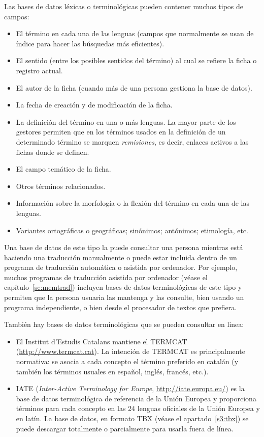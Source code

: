 Las bases de datos léxicas o terminológicas pueden contener muchos tipos de campos: \begin{itemize} \item El término en cada una de las lenguas (campos que normalmente se usan de índice para hacer las búsquedas más eficientes). \item El sentido (entre los posibles sentidos del término) al cual se refiere la ficha o registro actual. \item El autor de la ficha (cuando más de una persona gestiona la base de datos). \item La fecha de creación y de modificación de la ficha. \item La definición del término en una o más lenguas. La mayor parte de los gestores permiten que en los términos usados en la definición de un determinado término se marquen \emph{remisiones}, es decir, enlaces activos a las fichas donde se definen. \item El campo temático de la ficha. \item Otros términos relacionados. \item Información sobre la morfología o la flexión del término en cada una de las lenguas. \item Variantes ortográficas o geográficas; sinónimos; antónimos; etimología, etc. \end{itemize} 

Una base de datos de este tipo la puede consultar una persona mientras está haciendo una traducción manualmente o puede estar incluida dentro de un programa de traducción automática o asistida por ordenador. Por ejemplo, muchos programas de traducción asistida por ordenador (véase el capítulo~\ref{se:memtrad}) incluyen bases de datos terminológicas de este tipo y permiten que la persona usuaria las mantenga y las consulte, bien usando un programa independiente, o bien desde el procesador de textos que prefiera. 

También hay bases de datos terminológicas que se pueden consultar en linea: \begin{itemize} \item El Institut d'Estudis Catalans mantiene el TERMCAT (\url{http://www.termcat.cat}). La intención de TERMCAT es principalmente normativa: se asocia a cada concepto el término preferido en catalán (y también los términos usuales en español, inglés, francés, etc.). \item IATE (\emph{Inter-Active Terminology for Europe}, \url{http://iate.europa.eu/}) es la base de datos terminológica de referencia de la Unión Europea y proporciona términos para cada concepto en las 24 lenguas oficiales de la Unión Europea y en latín. La base de datos, en formato TBX (véase el apartado~\ref{s3:tbx}) se puede descargar totalmente o parcialmente para usarla fuera de línea. \end{itemize} 

